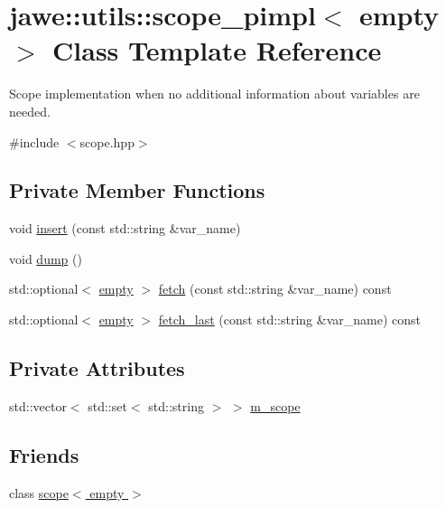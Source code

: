 \hypertarget{classjawe_1_1utils_1_1scope__pimpl_3_01empty_01_4}{}\section{jawe\+:\+:utils\+:\+:scope\+\_\+pimpl$<$ empty $>$ Class Template Reference}
\label{classjawe_1_1utils_1_1scope__pimpl_3_01empty_01_4}


Scope implementation when no additional information about variables are needed.  




{\ttfamily \#include $<$scope.\+hpp$>$}

\subsection*{Private Member Functions}
\begin{DoxyCompactItemize}
\item 
void \hyperlink{classjawe_1_1utils_1_1scope__pimpl_3_01empty_01_4_a882dea09bc4ee971c8effa5004b5dee3}{insert} (const std\+::string \&var\+\_\+name)
\item 
void \hyperlink{classjawe_1_1utils_1_1scope__pimpl_3_01empty_01_4_aead3f87985117e0e8a7214a7c719b410}{dump} ()
\item 
std\+::optional$<$ \hyperlink{classjawe_1_1utils_1_1empty}{empty} $>$ \hyperlink{classjawe_1_1utils_1_1scope__pimpl_3_01empty_01_4_afceb49bc52fb07097987a3a8ac527fb1}{fetch} (const std\+::string \&var\+\_\+name) const
\item 
std\+::optional$<$ \hyperlink{classjawe_1_1utils_1_1empty}{empty} $>$ \hyperlink{classjawe_1_1utils_1_1scope__pimpl_3_01empty_01_4_ab2950539698581fa27a3c59937ac9c1e}{fetch\+\_\+last} (const std\+::string \&var\+\_\+name) const
\end{DoxyCompactItemize}
\subsection*{Private Attributes}
\begin{DoxyCompactItemize}
\item 
std\+::vector$<$ std\+::set$<$ std\+::string $>$ $>$ \hyperlink{classjawe_1_1utils_1_1scope__pimpl_3_01empty_01_4_a54818451cbe56d4e17fa12c2a195c33a}{m\+\_\+scope}
\end{DoxyCompactItemize}
\subsection*{Friends}
\begin{DoxyCompactItemize}
\item 
class \hyperlink{classjawe_1_1utils_1_1scope__pimpl_3_01empty_01_4_ad892ae47ebacee276bb9a4ac0aae408e}{scope$<$ empty $>$}
\end{DoxyCompactItemize}


